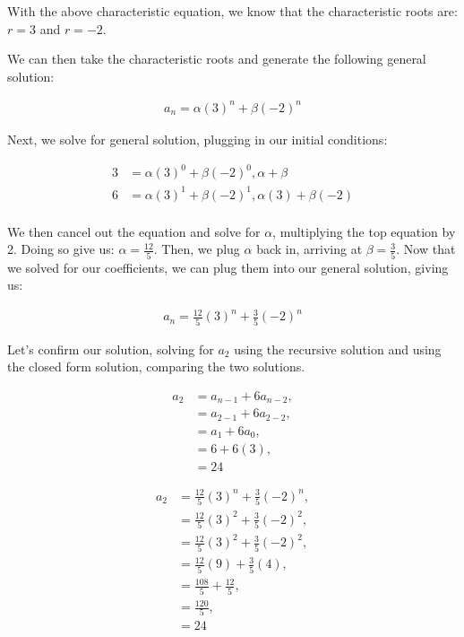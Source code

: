 \documentclass{article}
\begin{document}
With the above characteristic equation, we know that the characteristic roots are: $r=3$ and $r=-2$.

We can then take the characteristic roots and generate the following general solution:

\begin{align*}
    a_n = \alpha(3)^n + \beta(-2)^n
\end{align*}

Next, we solve for general solution, plugging in our initial conditions:

\begin{align*}
    3 &= \alpha(3)^0 + \beta(-2)^0, \alpha + \beta \\
    6 &= \alpha(3)^1 + \beta(-2)^1, \alpha(3) + \beta(-2) \\
\end{align*}

We then cancel out the equation and solve for $\alpha$, multiplying the top equation by 2. Doing so give us: $\alpha=\frac{12}{5}$. Then, we plug $\alpha$ back in, arriving at $\beta = \frac{3}{5}$. Now that we solved for our coefficients, we can plug them into our general solution, giving us:

\begin{align*}
    a_n = \frac{12}{5}(3)^n + \frac{3}{5}(-2)^n
\end{align*}

Let's confirm our solution, solving for $a_2$ using the recursive solution and using the closed form solution, comparing the two solutions.

\begin{align*}
    a_2 &= a_{n-1} + 6a_{n-2}, \\
        &= a_{2-1} + 6a_{2-2}, \\
        &= a_{1} + 6a_0, \\
        &= 6 + 6(3), \\
        &= 24
\end{align*}

\begin{align*}
    a_2 &= \frac{12}{5}(3)^n + \frac{3}{5}(-2)^n, \\
        &= \frac{12}{5}(3)^2 + \frac{3}{5}(-2)^2, \\
        &= \frac{12}{5}(3)^2 + \frac{3}{5}(-2)^2, \\
        &= \frac{12}{5}(9) + \frac{3}{5}(4), \\
        &= \frac{108}{5} + \frac{12}{5}, \\
        &= \frac{120}{5}, \\
        &= 24
\end{align*}
\end{document}
